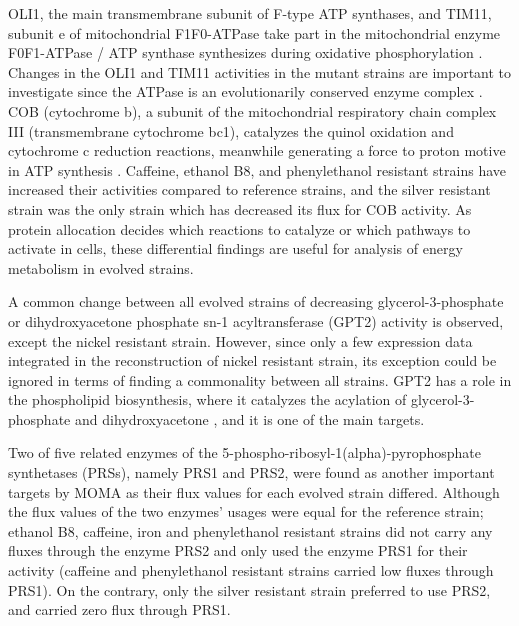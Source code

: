 OLI1, the main transmembrane subunit of F-type ATP synthases, and TIM11, subunit e of mitochondrial F1F0-ATPase take part in the mitochondrial enzyme F0F1-ATPase / ATP synthase synthesizes during oxidative phosphorylation \cite{arnold1997yeast, trembath1975biogenesis}. Changes in the OLI1 and TIM11 activities in the mutant strains  are important to investigate since the ATPase is an evolutionarily conserved enzyme complex \cite{tokatlidis1996translocation}. COB (cytochrome b), a subunit of the mitochondrial respiratory chain complex III (transmembrane cytochrome bc1), catalyzes the quinol oxidation and cytochrome c reduction reactions, meanwhile generating a force to proton motive in ATP synthesis \cite{meunier2013respiratory}. Caffeine, ethanol B8, and phenylethanol resistant strains have increased their activities compared to reference strains, and the silver resistant strain was the only strain which has decreased its flux for COB activity. As protein allocation decides which reactions to catalyze or which pathways to activate in cells, these differential findings are useful for analysis of energy metabolism in evolved strains.

A common change between all evolved strains of decreasing glycerol-3-phosphate or dihydroxyacetone phosphate sn-1 acyltransferase (GPT2) activity is observed, except the nickel resistant strain. However, since only a few expression data integrated in the reconstruction of nickel resistant strain, its exception could be ignored in terms of finding a commonality between all strains. GPT2 has a role in the phospholipid biosynthesis, where it catalyzes the acylation of glycerol-3-phosphate and dihydroxyacetone \cite{athenstaedt1997biosynthesis}, and it is one of the main targets.

Two of five related enzymes of the 5-phospho-ribosyl-1(alpha)-pyrophosphate synthetases (PRSs), namely PRS1 and PRS2, were found as another important targets by MOMA as their flux values for each evolved strain differed. Although the flux values of the two enzymes' usages were equal for the reference strain; ethanol B8, caffeine, iron and phenylethanol resistant strains did not carry any fluxes through the enzyme PRS2 and only used the enzyme PRS1 for their activity (caffeine and phenylethanol resistant strains carried low fluxes through PRS1). On the contrary, only the silver resistant strain preferred to use PRS2, and carried zero flux through PRS1.


